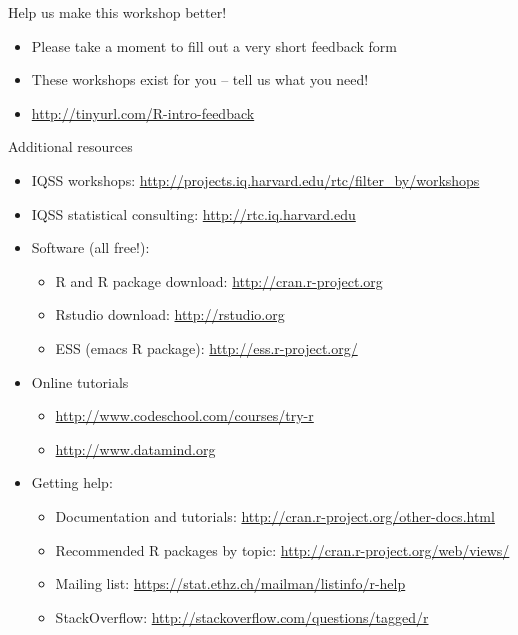 \documentclass[table,smaller]{beamer}
\begin{document}
\begin{frame}[label=sec-7-1]{Help us make this workshop better!}
\begin{itemize}
\item Please take a moment to fill out a very short feedback form

\item These workshops exist for you – tell us what you need!

\item \url{http://tinyurl.com/R-intro-feedback}
\end{itemize}
\end{frame}
\begin{frame}[label=sec-7-2]{Additional resources}
\begin{itemize}
\item IQSS workshops: \url{http://projects.iq.harvard.edu/rtc/filter_by/workshops}

\item IQSS statistical consulting: \url{http://rtc.iq.harvard.edu}

\item Software (all free!):
\begin{itemize}
\item R and R package download: \url{http://cran.r-project.org}
\item Rstudio download: \url{http://rstudio.org}
\item ESS (emacs R package): \url{http://ess.r-project.org/}
\end{itemize}

\item Online tutorials
\begin{itemize}
\item \url{http://www.codeschool.com/courses/try-r}
\item \url{http://www.datamind.org}
\end{itemize}

\item Getting help:
\begin{itemize}
\item Documentation and tutorials: \url{http://cran.r-project.org/other-docs.html}
\item Recommended R packages by topic: \url{http://cran.r-project.org/web/views/}
\item Mailing list: \url{https://stat.ethz.ch/mailman/listinfo/r-help}
\item StackOverflow: \url{http://stackoverflow.com/questions/tagged/r}
\end{itemize}
\end{itemize}
\end{frame}
\end{document}
